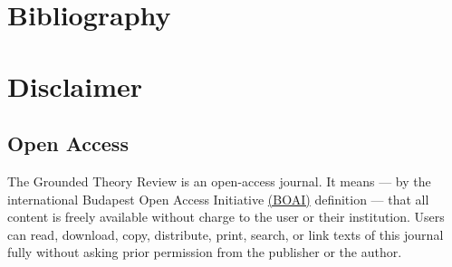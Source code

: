 \thispagestyle{plain}

\chapter*{Bibliography}

{}


\chapter*{Disclaimer}

\section*{Open Access}

The Grounded Theory Review is an open-access journal.
It means 
--- by the international Budapest Open Access Initiative 
\href{https://www.budapestopenaccessinitiative.org/}{(BOAI)}
definition --- that all content is freely available without charge to the user or their institution.
Users can read, download, copy, distribute, print, search, or link texts of this journal fully without asking prior permission from the publisher or the author.

